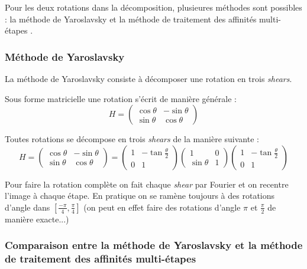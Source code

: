
Pour les deux rotations dans la décomposition, plusieures méthodes sont possibles : la méthode de Yaroslavsky \cite{unser1995convolution} et la méthode de traitement des affinités multi-étapes \cite{szeliski2010high}.

\subsubsection{Méthode de Yaroslavsky}

La méthode de Yaroslavsky consiste à décomposer une rotation en trois \emph{shears}.

Sous forme matricielle une rotation s'écrit de manière générale :
\begin{equation*}
	H=\begin{pmatrix}
	\cos \theta&-\sin \theta\\\sin \theta&\cos \theta
	\end{pmatrix}
	\end{equation*}
\begin{prop}
Toutes rotations se décompose en trois \emph{shears} de la manière suivante :
\begin{equation*}
	H=\begin{pmatrix}
	\cos \theta&-\sin \theta\\\sin \theta&\cos \theta
	\end{pmatrix}=\begin{pmatrix}
	1&-\tan \frac{\theta}{2}\\0&1
	\end{pmatrix}\begin{pmatrix}
	1&0\\\sin \theta&1
	\end{pmatrix}\begin{pmatrix}
	1&-\tan \frac{\theta}{2}\\0&1
	\end{pmatrix}
	\end{equation*}
\end{prop}

	Pour faire la rotation complète on fait chaque \emph{shear} par Fourier et on recentre l'image à chaque étape.
	En pratique on se ramène toujours à des rotations d'angle dans $[\frac{-\pi}{4},\frac{\pi}{4}]$ (on peut en effet faire des rotations d'angle $\pi$ et $\frac{\pi}{2}$ de manière exacte...)  


\subsubsection{Comparaison entre la méthode de Yaroslavsky et la méthode de traitement des affinités multi-étapes}

